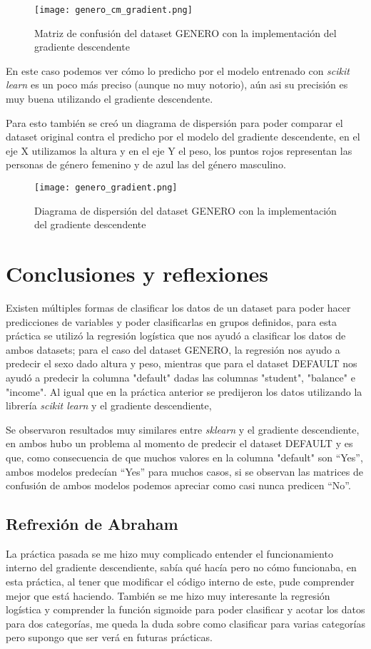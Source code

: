 \documentclass[sigconf,authorversion,nonacm]{acmart}
\begin{document}
\begin{figure}[H]
  \centering
  \texttt{[image: genero\_cm\_gradient.png]}
  \caption{Matriz de confusión del dataset GENERO con la implementación del gradiente descendente}
\end{figure}

En este caso podemos ver cómo lo predicho por el modelo entrenado con \textit{scikit learn} es un poco más preciso (aunque no muy notorio), aún asi su precisión es muy buena utilizando el gradiente descendente.

Para esto también se creó un diagrama de dispersión para poder comparar el dataset original contra el predicho por el modelo del gradiente descendente, en el eje X utilizamos la altura y en el eje Y el peso, los puntos rojos representan las personas de género femenino y de azul las del género masculino.

\begin{figure}[H]
  \centering
  \texttt{[image: genero\_gradient.png]}
  \caption{Diagrama de dispersión del dataset GENERO con la implementación del gradiente descendente}
\end{figure}


\section{Conclusiones y reflexiones}
Existen múltiples formas de clasificar los datos de un dataset para poder hacer predicciones de variables y poder clasificarlas en grupos definidos, para esta práctica se utilizó la regresión logística que nos ayudó a clasificar los datos de ambos datasets; para el caso del dataset GENERO, la regresión nos ayudo a predecir el sexo dado altura y peso, mientras que para el dataset DEFAULT nos ayudó a predecir la columna "default" dadas las columnas "student", "balance" e "income". Al igual que en la práctica anterior se predijeron los datos utilizando la librería \textit{scikit learn} y el gradiente descendiente,

Se observaron resultados muy similares entre \textit{sklearn} y el gradiente descendiente, en ambos hubo un problema al momento de predecir el dataset DEFAULT y es que, como consecuencia de que muchos valores en la columna "default" son “Yes”, ambos modelos predecían “Yes” para muchos casos, si se observan las matrices de confusión de ambos modelos podemos apreciar como casi nunca predicen “No”.

\subsection{Refrexión de Abraham}
La práctica pasada se me hizo muy complicado entender el funcionamiento interno del gradiente descendiente, sabía qué hacía pero no cómo funcionaba, en esta práctica, al tener que modificar el código interno de este, pude comprender mejor que está haciendo. También se me hizo muy interesante la regresión logística y comprender la función sigmoide para poder clasificar y acotar los datos para dos categorías, me queda la duda sobre como clasificar para varias categorías pero supongo que ser verá en futuras prácticas.
\end{document}

